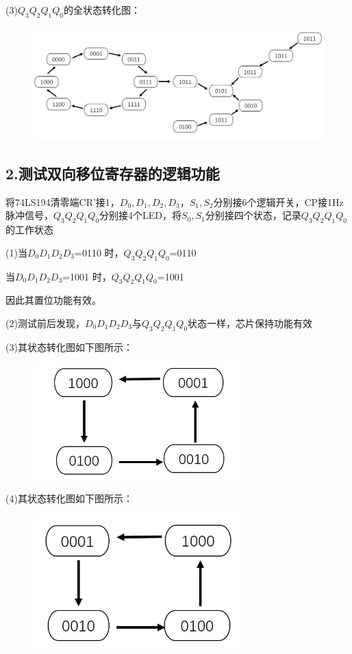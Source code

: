 \documentclass{ctexart}
\begin{document}
    (3)$Q_3Q_2Q_1Q_0$的全状态转化图：
    \begin{figure}[htbp]
        \centering
        \includegraphics[width=15cm]{3.1.7.png}
    \end{figure}

    \subsection*{2.测试双向移位寄存器的逻辑功能}
    将74LS194清零端CR’接1，$D_0,D_1,D_2,D_3，S_1,S_2$分别接6个逻辑开关，CP接1Hz脉冲信号，$Q_3Q_2Q_1Q_0$分别接4个LED，将$S_0,S_1$分别接四个状态，记录$Q_3Q_2Q_1Q_0$的工作状态


    (1)当$D_0D_1D_2D_3$=0110 时，$Q_3Q_2Q_1Q_0$=0110

       当$D_0D_1D_2D_3$=1001 时，$Q_3Q_2Q_1Q_0$=1001

       因此其置位功能有效。

    (2)测试前后发现，$D_0D_1D_2D_3$与$Q_3Q_2Q_1Q_0$状态一样，芯片保持功能有效

    (3)其状态转化图如下图所示：
    
    \begin{figure}[htbp]
        \centering
        \includegraphics[width=8cm]{3.2.1.png}
    \end{figure}

    (4)其状态转化图如下图所示：
    
    \begin{figure}[htbp]
        \centering
        \includegraphics[width=8cm]{3.2.2.png}
    \end{figure}
\end{document}
